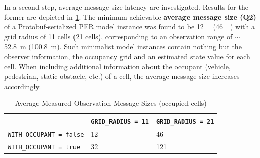 In a second step, average message size latency are investigated. Results for the former are depicted in \cref{tab:performance_evaluation:message_sizes}. The minimum achievable \textbf{average message size (Q2)} of a Protobuf-serialized PER model instance was found to be \SI{12}{\kilo\byte} (\SI{46}{\kilo\byte}) with a grid radius of 11 cells (21 cells), corresponding to an observation range of $\sim$ \SI{52.8}{\meter} (\SI{100.8}{\meter}). Such minimalist model instances contain nothing but the observer information, the occupancy grid and an estimated state value for each cell. When including additional information about the occupant (vehicle, pedestrian, static obstacle, etc.) of a cell, the average message size increases accordingly.

\begin{table}
	\centering
	\begin{tabular}{|p{6.2cm}|p{3.5cm}|p{3.5cm}|}
		\hline 
		& \texttt{GRID\_RADIUS = 11} & \texttt{GRID\_RADIUS = 21} \\ 
		\hline 
		\texttt{WITH\_OCCUPANT = false} & \SI{12}{\kilo\byte} & \SI{46}{\kilo\byte} \\ 
		\hline 
		\texttt{WITH\_OCCUPANT = true} & \SI{32}{\kilo\byte} & 1\SI{21}{\kilo\byte} \\ 
		\hline 
	\end{tabular}
	\caption[Average Measured Observation Message Sizes]{Average  Measured Observation Message Sizes (occupied cells)}
	\label{tab:performance_evaluation:message_sizes}
\end{table}
\par
\bigskip

